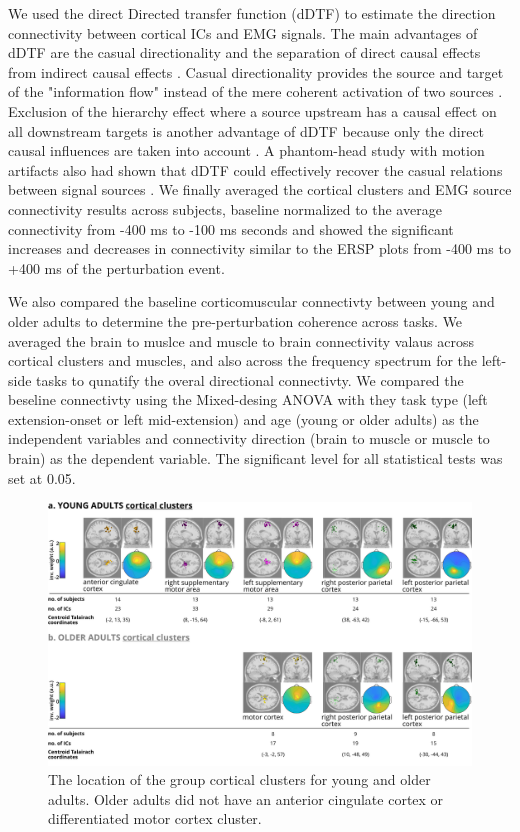 \documentclass[../thesis_seyed.tex]{subfiles}
\begin{document}
We used the direct Directed transfer function (dDTF) to estimate the direction connectivity between cortical ICs and EMG signals. The main advantages of dDTF are the casual directionality and the separation of direct causal effects from indirect causal effects \cite{Korzeniewska2003-ol,Peterson2019-wz,Cohen2014-vt,Kaminski2001-oi}. Casual directionality provides the source and target of the "information flow" instead of the mere coherent activation of two sources \cite{Kaminski2001-oi}. Exclusion of the hierarchy effect where a source upstream has a causal effect on all downstream targets is another advantage of dDTF because only the direct causal influences are taken into account \cite{Korzeniewska2003-ol}. A phantom-head study with motion artifacts also had shown that dDTF could effectively recover the casual relations between signal sources \cite{Peterson2018-la}. We finally averaged the cortical clusters and EMG source connectivity results across subjects, baseline normalized to the average connectivity from -400 ms to -100 ms seconds and showed the significant increases and decreases in connectivity similar to the ERSP plots from -400 ms to +400 ms of the perturbation event.

We also compared the baseline corticomuscular connectivty between young and older adults to determine the pre-perturbation coherence across tasks. We averaged the brain to muslce and muscle to brain connectivity valaus across cortical clusters and muscles, and also across the frequency spectrum for the left-side tasks to qunatify the overal directional connectivty. We compared the beseline connectivty using the Mixed-desing ANOVA with they task type (left extension-onset or left mid-extension) and age (young or older adults) as the independent variables and connectivity direction (brain to muscle or muscle to brain) as the dependent variable. The significant level for all statistical tests was set at 0.05.

\begin{figure}[tb]
    \centering
    \includegraphics[width=\linewidth]{../img/figure 2 - individual cluster.jpg}
    \caption{The location of the group cortical clusters for young and older adults. Older adults did not have an anterior cingulate cortex or differentiated motor cortex cluster.}
    \label{fig:yo_dipoles}
\end{figure}
\end{document}
